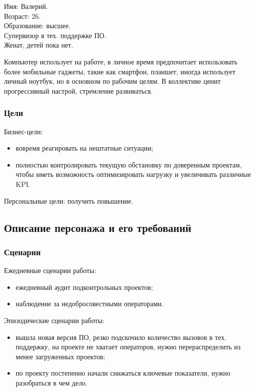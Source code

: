 \noindent Имя: Валерий. \\
Возраст: 26. \\
Образование: высшее. \\
Супервизор в тех. поддержке ПО. \\
Женат, детей пока нет.

Компьютер использует на работе,
в личное время предпочитает использовать более мобильные гаджеты,
такие как смартфон, планшет, иногда использует личный ноутбук,
но в основном по рабочим целям.
В коллективе ценит прогрессивный настрой, стремление развиваться.

\subsubsection{Цели}

Бизнес-цели:
\begin{itemize}
    \item вовремя реагировать на нештатные ситуации;
    \item полностью контролировать текущую обстановку по доверенным проектам, чтобы иметь возможность оптимизировать нагрузку и увеличивать различные KPI\@.
\end{itemize}

Персональные цели: получить повышение.

\subsection{Описание персонажа и его требований}

\subsubsection{Сценарии}

Ежедневные сценарии работы:
\begin{itemize}
    \item ежедневный аудит подконтрольных проектов;
    \item наблюдение за недобросовестными операторами.
\end{itemize}

Эпизодические сценарии работы:
\begin{itemize}
    \item вышла новая версия ПО, резко подскочило количество вызовов в тех. поддержку, на проекте не хватает операторов, нужно перераспределить из менее загруженных проектов;
    \item по проекту постепенно начали снижаться ключевые показатели, нужно разобраться в чем дело.
\end{itemize}

